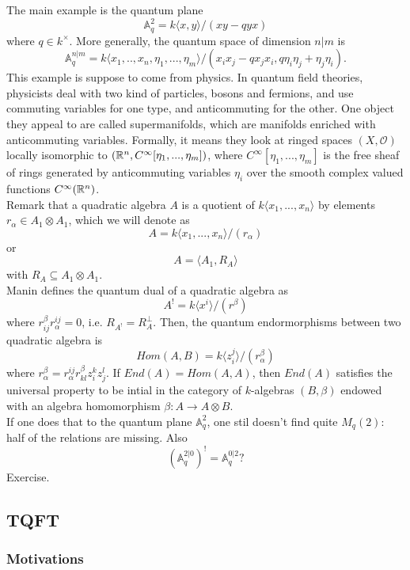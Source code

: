 The main example is the quantum plane
\[\mathbb A_q^{2} = k\langle x,y \rangle / (xy -qyx)\]
where $q\in k^\times$. More generally, the quantum space of dimension $n|m$ is
\[ \mathbb A_q^{n|m} = k\langle x_1,.. ,x_n , \eta_1,...,\eta_m \rangle / (x_i x_j - q x_j x_i , q \eta_i \eta_j +  \eta_j \eta_i).\]
This example is suppose to come from physics. In quantum field theories, physicists deal with two kind of particles, bosons and fermions, and use commuting variables for one type, and anticommuting for the other. One object they appeal to are called supermanifolds, which are manifolds enriched with anticommuting variables. Formally, it means they look at ringed spaces $(X,\mathcal O)$ locally isomorphic to $(\mathbb R^n, C^\infty [\eta_1,...,\eta_m])$, where $C^\infty [\eta_1,...,\eta_m]$ is the free sheaf of rings generated by anticommuting variables $\eta_i$ over the smooth complex valued functions $C^\infty(\mathbb R^n)$.\\

Remark that a quadratic algebra $A$ is a quotient of $k\langle x_1,... ,x_n\rangle$ by elements $r_\alpha \in A_1 \otimes A_1$, which we will denote as 
\[A= k\langle x_1,... ,x_n\rangle / (r_\alpha)\]
or \[A= \langle A_1, R_A\rangle\]
with $R_A \subseteq A_1 \otimes A_1$.\\

Manin defines the quantum dual of a quadratic algebra as
\[A^{!} = k\langle x^i\rangle / (r^\beta)\]
where $r^\beta_{ij}r^{ij}_\alpha = 0$, i.e. $R_{A^!}=R_{A}^\perp$. Then, the quantum endormorphisms between two quadratic algebra is
\[Hom(A,B) =k\langle z^j_i\rangle / (r_\alpha^\beta)\]
where $r_\alpha^\beta = r_\alpha^{ij}r^\beta_{kl} z_i^k z_j^l$. If $End(A)= Hom(A,A)$, then $End(A)$ satisfies the universal property to be intial in the category of $k$-algebras $(B,\beta)$ endowed with an algebra homomorphism $\beta: A \rightarrow A\otimes B$.\\ 

If one does that to the quantum plane $\mathbb A_q^2$, one stil doesn't find quite $M_q(2)$: half of the relations are missing. Also 
\[(\mathbb A_q^{2|0})^! = \mathbb A_q^{0|2}?\] Exercise.

\subsection{TQFT}

\subsubsection{Motivations}

